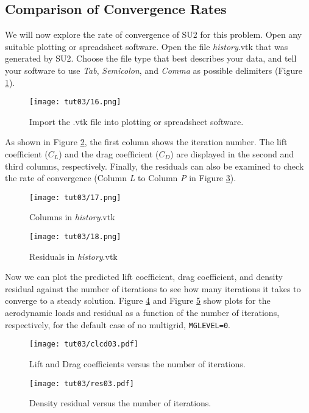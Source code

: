 \subsection{Comparison of Convergence Rates}
We will now explore the rate of convergence of SU2 for this problem. Open any suitable plotting or spreadsheet software. Open the file \textit{history}.vtk that was generated by SU2. Choose the file type that best describes your data, and tell your software to use \textit{Tab}, \textit{Semicolon}, and \textit{Comma} as possible delimiters (Figure \ref{fig3:importvtkxlxs}).
\begin{figure}[htbp]
    \centering
    \texttt{[image: tut03/16.png]}
    \caption{Import the .vtk file into plotting or spreadsheet software.}
    \label{fig3:importvtkxlxs}
\end{figure}
As shown in Figure \ref{fig3:columnsxlxs}, the first column shows the iteration number. The lift coefficient ($C_L$) and the drag coefficient ($C_D$) are displayed in the second and third columns, respectively. Finally, the residuals can also be examined to check the rate of convergence (Column \textit{L} to Column \textit{P} in Figure \ref{fig3:residualxlxs}).
\begin{figure}[htbp]
    \centering
    \texttt{[image: tut03/17.png]}
    \caption{Columns in \textit{history}.vtk}
    \label{fig3:columnsxlxs}
\end{figure}
\begin{figure}[htbp]
    \centering
    \texttt{[image: tut03/18.png]}
    \caption{Residuals in \textit{history}.vtk}
    \label{fig3:residualxlxs}
\end{figure}
Now we can plot the predicted lift coefficient, drag coefficient, and density residual against the number of iterations to see how many iterations it takes to converge to a steady solution. Figure \ref{fig3:clcdxlxs} and Figure \ref{fig3:res_vs_itr} show plots for the aerodynamic loads and residual as a function of the number of iterations, respectively, for the default case of no multigrid, \texttt{MGLEVEL=0}.
\begin{figure}[htbp]
    \centering
    \texttt{[image: tut03/clcd03.pdf]}
    \caption{Lift and Drag coefficients versus the number of iterations.}
    \label{fig3:clcdxlxs}
\end{figure}
\begin{figure}[htbp]
    \centering
    \texttt{[image: tut03/res03.pdf]}
    \caption{Density residual versus the number of iterations.}
    \label{fig3:res_vs_itr}
\end{figure}
\clearpage
